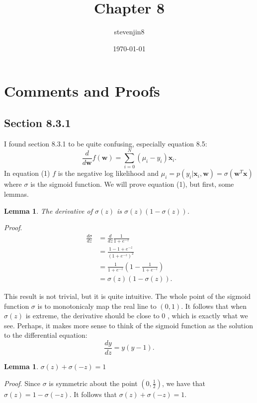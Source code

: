 \documentclass[a4paper,11pt]{article}
\title{Chapter 8}
\author{stevenjin8}
\date{\today}
\theoremstyle{plain}
\newtheorem{lemma}[theorem]{Lemma}
\begin{document}
\maketitle
\section*{Comments and Proofs}
\setcounter{section}{1}
\subsection*{Section 8.3.1}
I found section 8.3.1 to be quite confusing, especially
equation 8.5:
\begin{equation}
    \frac{d}{d\mathbf{w}}f(\mathbf{w}) =
    \sum\limits_{i=0}^{N}(\mu_i-y_i)\mathbf{x}_i.
\end{equation}
In equation (1) $f$ is the negative log likelihood and
$\mu_i=p(y_i | \mathbf{x}_i, \mathbf{w})=\sigma(\mathbf{w}^T
\mathbf{x})$ where $\sigma$ is the sigmoid function.
We will prove equation (1), but first, some lemmas.
\begin{lemma}
The derivative of $\sigma(z)$ is $\sigma(z)(1-\sigma(z))$.
\end{lemma}

\textit{Proof}.
\begin{align*}
    \frac{d\sigma}{dz} & = \frac{d}{dz}\frac{1}{1+
    e^{-z}} \\
    & = \frac{1-1+e^{-z}}{(1+e^{-z})^2} \\
    & = \frac{1}{1+e^{-z}}\left(1-\frac{1}{1+e^{-z}}\right)\\
    & = \sigma(z)(1-\sigma(z)).
\end{align*}

This result is not trivial, but it is quite intuitive. The whole point of the sigmoid function
$\sigma$ is to monotonicaly map the real line to $(0,1)$. It follows that when
$\sigma(z)$ is extreme, the derivative should be close to $0$ , which is exactly what we see.
Perhaps, it makes more sense to think of the sigmoid function as the solution to the 
differential equation:
\[
    \frac{dy}{dz}=y(y-1).
\]

\begin{lemma}
    $\sigma(z)+\sigma(-z)=1$
\end{lemma}

\textit{Proof}. Since $\sigma$ is symmetric about the point $(0, \frac12)$, we have that 
$\sigma(z)=1-\sigma(-z)$. It follows that $\sigma(z)+\sigma(-z)=1$.
\end{document}
